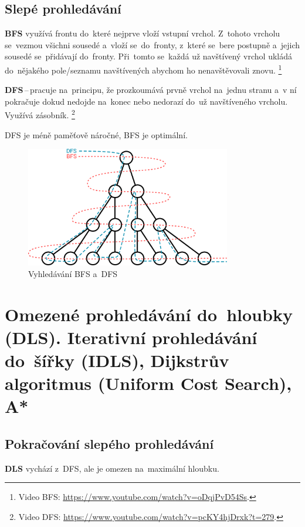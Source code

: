 \subsection{Slepé prohledávání}

\textbf{BFS} využívá frontu do~které nejprve vloží vstupní vrchol. Z~tohoto vrcholu se~vezmou všichni sousedé a~vloží se~do~fronty, z~které se~bere postupně a~jejich sousedé se~přidávají do~fronty. Při~tomto se~každá už navštívený vrchol ukládá do~nějakého pole/seznamu navštívených abychom ho nenavštěvovali znovu.%
\footnote{Video BFS: \url{https://www.youtube.com/watch?v=oDqjPvD54Ss}.}

\textbf{DFS}\,--\,pracuje na~principu, že prozkoumává prvně vrchol na~jednu stranu a~v ní pokračuje dokud nedojde na~konec nebo nedorazí do~už navštíveného vrcholu. Využívá zásobník.%
\footnote{Video DFS: \url{https://www.youtube.com/watch?v=pcKY4hjDrxk?t=279}.}

DFS je méně paměťově náročné, BFS je optimální.

\begin{figure}[ht]
	\centering
	\includegraphics[width=0.8\textwidth]{images/bfs-dfs.png}
	\caption{Vyhledávání BFS a~DFS}
\end{figure}

\clearpage
\section{Omezené prohledávání do~hloubky (DLS). Iterativní prohledávání do~šířky (IDLS), Dijkstrův algoritmus (Uniform Cost Search), A*}

\subsection{Pokračování slepého prohledávání}

\textbf{DLS} vychází z~DFS, ale je omezen na~maximální hloubku.

